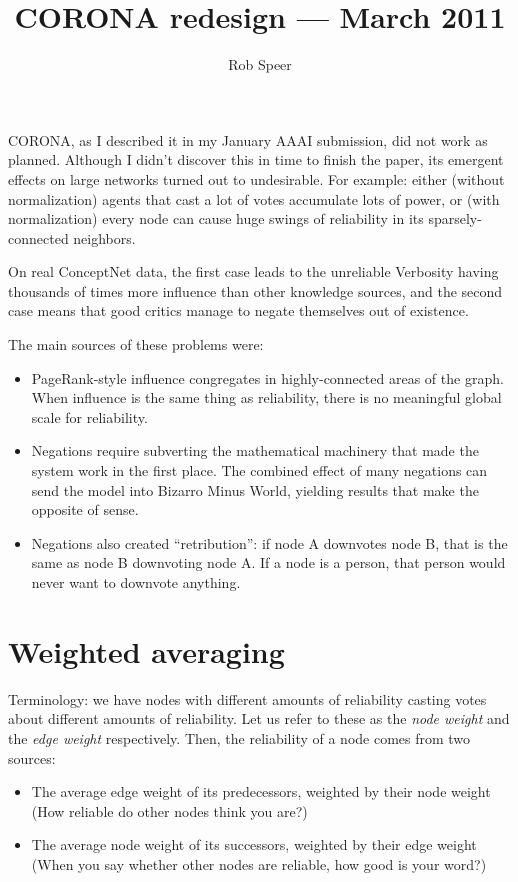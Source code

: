 \documentclass{article}
\title{CORONA redesign --- March 2011}
\author{Rob Speer}
\begin{document}
\maketitle

CORONA, as I described it in my January AAAI submission, did not work as
planned. Although I didn't discover this in time to finish the paper, its
emergent effects on large networks turned out to undesirable.  For example:
either (without normalization) agents that cast a lot of votes accumulate lots
of power, or (with normalization) every node can cause huge swings of
reliability in its sparsely-connected neighbors.

On real ConceptNet data, the first case leads to the unreliable Verbosity
having thousands of times more influence than other knowledge sources, and the
second case means that good critics manage to negate themselves out of
existence.

The main sources of these problems were:
\begin{itemize}
\item PageRank-style influence congregates in highly-connected areas of the
  graph. When influence is the same thing as reliability, there is no
  meaningful global scale for reliability.
\item Negations require subverting the mathematical machinery that made the
  system work in the first place. The combined effect of many negations can
  send the model into Bizarro Minus World, yielding results that make the
  opposite of sense.
\item Negations also created ``retribution'': if node A downvotes node B, that is the
  same as node B downvoting node A. If a node is a person, that person would
  never want to downvote anything.
\end{itemize}
\section{Weighted averaging}

Terminology: we have nodes with different amounts of reliability casting votes
about different amounts of reliability. Let us refer to these as the \emph{node
weight} and the \emph{edge weight} respectively. Then, the reliability of a
node comes from two sources:

\begin{itemize}
\item The average edge weight of its predecessors, weighted by their node weight
  (How reliable do other nodes think you are?)
\item The average node weight of its successors, weighted by their edge weight
  (When you say whether other nodes are reliable, how good is your word?)
\end{itemize}
\end{document}
